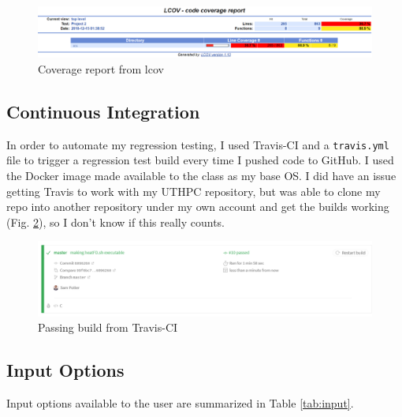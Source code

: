 \documentclass[letterpaper,12pt]{article}
\begin{document}
\begin{figure}[h]
\centering
\label{fig:cov}
\includegraphics[width=1 \textwidth]{coverage.png}
\caption{Coverage report from lcov}
\end{figure}

\subsection{Continuous Integration}
In order to automate my regression testing, I used Travis-CI and a \verb|travis.yml| file to trigger a regression test build every time I pushed code to GitHub. I used the Docker image made available to the class as my base OS. I did have an issue getting Travis to work with my UTHPC repository, but was able to clone my repo into another repository under my own account and get the builds working (Fig. \ref{fig:travis}), so I don't know if this really counts.

\begin{figure}[h]
\centering
\label{fig:travis}
\includegraphics[width=1 \textwidth]{Travis.png}
\caption{Passing build from Travis-CI}
\end{figure}

\subsection{Input Options}
Input options available to the user are summarized in Table \ref{tab:input}.
\end{document}
